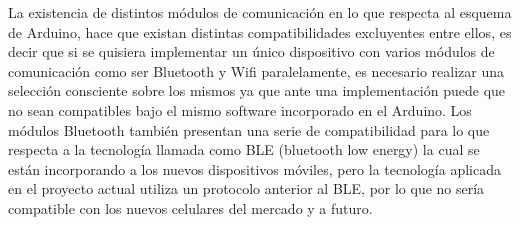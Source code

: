 \documentclass{IEEEtran}
\begin{document}
		La existencia de distintos módulos de comunicación en lo que respecta al esquema de Arduino, hace que existan distintas compatibilidades excluyentes entre ellos, es decir que si se quisiera implementar un único dispositivo con varios módulos de comunicación como ser Bluetooth y Wifi paralelamente, es necesario realizar una selección consciente sobre los mismos ya que ante una implementación puede que no sean compatibles bajo el mismo software incorporado en el Arduino. Los módulos Bluetooth también presentan una serie de compatibilidad para lo que respecta a la tecnología llamada como BLE (bluetooth low energy) la cual se están incorporando a los nuevos dispositivos móviles, pero la tecnología aplicada en el proyecto actual utiliza un protocolo anterior al BLE, por lo que no sería compatible con los nuevos celulares del mercado y a futuro.
\end{document}
